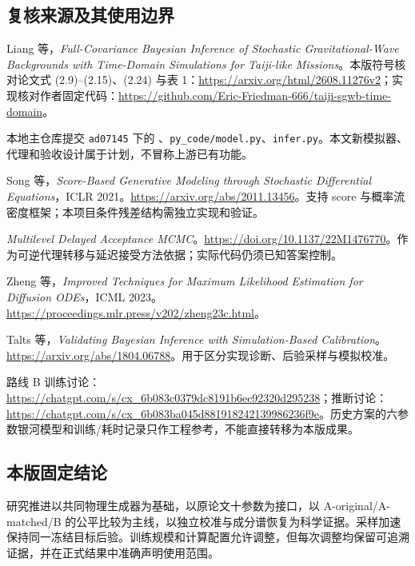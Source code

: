 \documentclass[UTF8,fontset=none,a4paper,11pt]{ctexart}
\begin{document}
\subsection{复核来源及其使用边界}
\begin{enumerate}[label={[\arabic*]}]
\item Liang 等，\emph{Full-Covariance Bayesian Inference of Stochastic Gravitational-Wave Backgrounds with Time-Domain Simulations for Taiji-like Missions}。本版符号核对论文式 (2.9)--(2.15)、(2.24) 与表 1：\url{https://arxiv.org/html/2608.11276v2}；实现核对作者固定代码：\url{https://github.com/Eric-Friedman-666/taiji-sgwb-time-domain}。
\item 本地主仓库提交 \texttt{ad07145} 下的 、\texttt{py\_code/model.py}、\texttt{infer.py}。本文新模拟器、代理和验收设计属于计划，不冒称上游已有功能。
\item Song 等，\emph{Score-Based Generative Modeling through Stochastic Differential Equations}，ICLR 2021。\url{https://arxiv.org/abs/2011.13456}。支持 score 与概率流密度框架；本项目条件残差结构需独立实现和验证。
\item \emph{Multilevel Delayed Acceptance MCMC}。\url{https://doi.org/10.1137/22M1476770}。作为可逆代理转移与延迟接受方法依据；实际代码仍须已知答案控制。
\item Zheng 等，\emph{Improved Techniques for Maximum Likelihood Estimation for Diffusion ODEs}，ICML 2023。\url{https://proceedings.mlr.press/v202/zheng23c.html}。
\item Talts 等，\emph{Validating Bayesian Inference with Simulation-Based Calibration}。\url{https://arxiv.org/abs/1804.06788}。用于区分实现诊断、后验采样与模拟校准。
\item 路线 B 训练讨论：\url{https://chatgpt.com/s/cx_6b083c0379dc8191b6ec92320d295238}；推断讨论：\url{https://chatgpt.com/s/cx_6b083ba045d881918242139986236f9e}。历史方案的六参数银河模型和训练/耗时记录只作工程参考，不能直接转移为本版成果。
\end{enumerate}
\subsection{本版固定结论}
研究推进以共同物理生成器为基础，以原论文十参数为接口，以 A-original/A-matched/B 的公平比较为主线，以独立校准与成分谱恢复为科学证据。采样加速保持同一冻结目标后验。训练规模和计算配置允许调整，但每次调整均保留可追溯证据，并在正式结果中准确声明使用范围。
\end{document}
